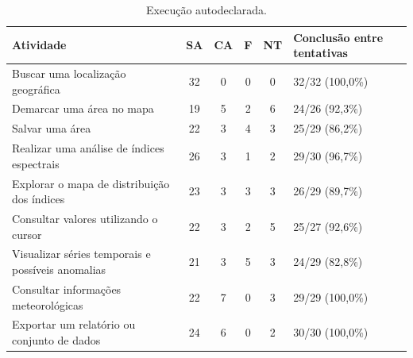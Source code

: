 \begin{table}[htbp]
\centering\small
\caption{Execução autodeclarada.}
\label{tab:usuarios-tarefas}
\begin{tabular}{p{}ccccp{}}
\hline
Atividade & SA & CA & F & NT & Conclusão entre tentativas\\ \hline
Buscar uma localização geográfica & 32 & 0 & 0 & 0 & 32/32 (100,0\%)\\
Demarcar uma área no mapa & 19 & 5 & 2 & 6 & 24/26 (92,3\%)\\
Salvar uma área & 22 & 3 & 4 & 3 & 25/29 (86,2\%)\\
Realizar uma análise de índices espectrais & 26 & 3 & 1 & 2 & 29/30 (96,7\%)\\
Explorar o mapa de distribuição dos índices & 23 & 3 & 3 & 3 & 26/29 (89,7\%)\\
Consultar valores utilizando o cursor & 22 & 3 & 2 & 5 & 25/27 (92,6\%)\\
Visualizar séries temporais e possíveis anomalias & 21 & 3 & 5 & 3 & 24/29 (82,8\%)\\
Consultar informações meteorológicas & 22 & 7 & 0 & 3 & 29/29 (100,0\%)\\
Exportar um relatório ou conjunto de dados & 24 & 6 & 0 & 2 & 30/30 (100,0\%)\\
\hline
\end{tabular}
\end{table}

